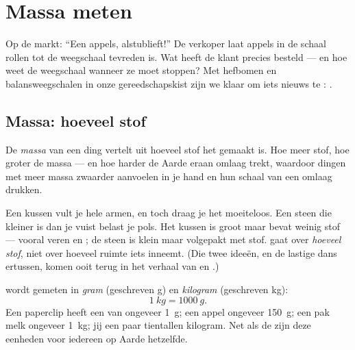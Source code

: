 \chapter{Massa meten}\label{ch:g3:measuring-mass}

Op de markt: ``Een  appels, alstublieft!'' De verkoper laat
appels in de schaal rollen tot de weegschaal tevreden is. Wat heeft de
klant precies besteld --- en hoe weet de weegschaal wanneer ze moet
stoppen? Met hefbomen en balansweegschalen in onze gereedschapskist
zijn we klaar om iets nieuws te : .

\section{Massa: hoeveel stof}

\begin{definition}[Massa]\label{def:g3:measuring-mass:mass}
De \emph{massa} van een ding vertelt uit hoeveel stof het
gemaakt is. Hoe meer stof, hoe groter de massa --- en hoe harder de
Aarde eraan omlaag trekt, waardoor dingen met meer massa zwaarder
aanvoelen in je hand en hun schaal van een  omlaag
drukken.
\end{definition}

\begin{example}\label{ex:g3:measuring-mass:bignotcheavy}
Een kussen vult je hele armen, en toch draag je het moeiteloos. Een
steen die kleiner is dan je vuist belast je pols. Het kussen is groot
maar bevat weinig stof --- vooral veren en ; de steen is klein
maar volgepakt met stof.  gaat over \emph{hoeveel stof}, niet over
hoeveel ruimte iets inneemt. (Die twee ideeën, en de lastige dans
ertussen, komen ooit terug in het verhaal van  en .)
\end{example}

\begin{definition}\label{def:g3:measuring-mass:units}
 wordt gemeten in \emph{gram} (geschreven
\unit{g}) en \emph{kilogram} (geschreven \unit{kg}):
\[
\qty{1}{kg} = \qty{1000}{g}.
\]
Een paperclip heeft een  van ongeveer \qty{1}{g}; een appel
ongeveer \qty{150}{g}; een pak melk ongeveer \qty{1}{kg}; jij een
paar tientallen kilogram. Net als de  zijn deze eenheden voor
iedereen op Aarde hetzelfde.
\end{definition}


